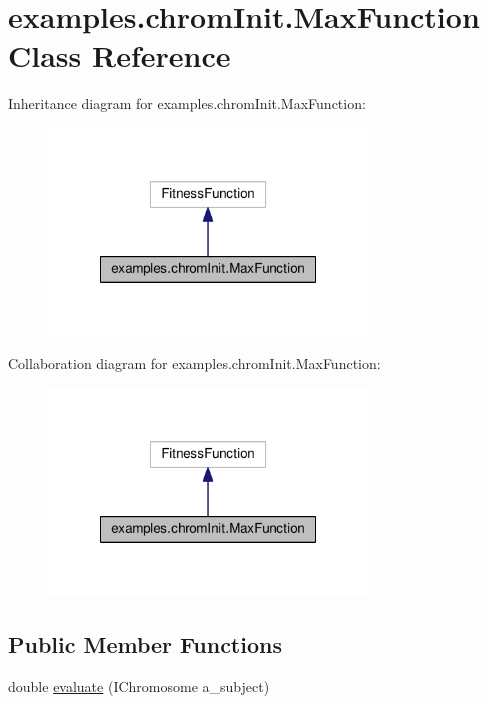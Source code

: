 \hypertarget{classexamples_1_1chrom_init_1_1_max_function}{\section{examples.\-chrom\-Init.\-Max\-Function Class Reference}
\label{classexamples_1_1chrom_init_1_1_max_function}
}


Inheritance diagram for examples.\-chrom\-Init.\-Max\-Function\-:
\nopagebreak
\begin{figure}[H]
\begin{center}
\leavevmode
\includegraphics[width=240pt]{classexamples_1_1chrom_init_1_1_max_function__inherit__graph}
\end{center}
\end{figure}


Collaboration diagram for examples.\-chrom\-Init.\-Max\-Function\-:
\nopagebreak
\begin{figure}[H]
\begin{center}
\leavevmode
\includegraphics[width=240pt]{classexamples_1_1chrom_init_1_1_max_function__coll__graph}
\end{center}
\end{figure}
\subsection*{Public Member Functions}
\begin{DoxyCompactItemize}
\item 
double \hyperlink{classexamples_1_1chrom_init_1_1_max_function_afc734252439001c406fb03763b7b2351}{evaluate} (I\-Chromosome a\-\_\-subject)
\end{DoxyCompactItemize}
